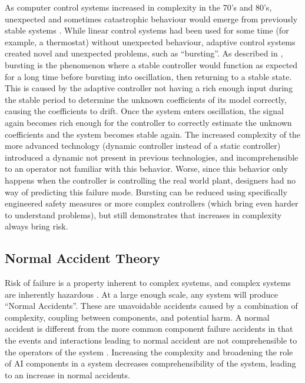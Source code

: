 \documentclass[11pt]{article}
\begin{document}
As computer control systems increased in complexity in the 70's and 80's, unexpected and sometimes
catastrophic behaviour would emerge from previously stable systems \cite{anderson2005control}. While
linear control systems had been used for some time (for example, a thermostat) without unexpected
behaviour, adaptive control systems created novel and unexpected problems, such as ``bursting''. As
described in \cite{anderson2005control}, bursting is the phenomenon where a stable controller would
function as expected for a long time before bursting into oscillation, then returning to a stable
state. This is caused by the adaptive controller not having a rich enough input during the stable
period to determine the unknown coefficients of its model correctly, causing the coefficients to
drift. Once the system enters oscillation, the signal again becomes rich enough for the controller
to correctly estimate the unknown coefficients and the system becomes stable again. The increased
complexity of the more advanced technology (dynamic controller instead of a  static controller)
introduced a dynamic not present in previous technologies, and incomprehensible to an operator not
familiar with this behavior. Worse, since this behavior only happens when the controller is
controlling the real world plant, designers had no way of predicting this failure mode. Bursting can
be reduced using specifically engineered safety measures or more complex controllers (which bring
even harder to understand problems), but still demonstrates that increases in complexity always
bring risk.

\subsection{Normal Accident Theory}

Risk of failure is a property inherent to complex systems, and complex systems are inherently
hazardous \cite{cook1998complex}.  At a large enough scale, any system will produce ``Normal
Accidents''. These are unavoidable accidents caused by a combination of complexity, coupling between
components, and potential harm. A normal accident is different from the more common component
failure accidents in that the events and interactions leading to normal accident are not
comprehensible to the operators of the system \cite{perrow1984living}. Increasing the complexity
and broadening the role of AI components in a system decreases comprehensibility of the system,
leading to an increase in normal accidents.
\end{document}
